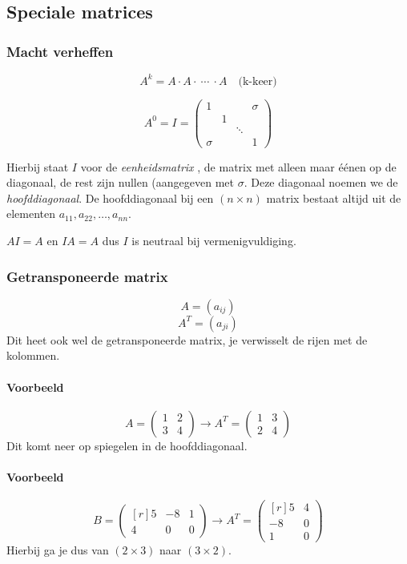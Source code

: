 \subsection{Speciale matrices}
\subsubsection{Macht verheffen}
\[ A^k = A \cdot A \cdot ~ \cdots ~ \cdot A \quad \mbox{(k-keer)} \]

\[ A^0 = I = \begin{pmatrix}
	1 & & &\sigma \\
	& 1 & &\\
	& & \ddots & \\
	\sigma & & & 1
\end{pmatrix} \]
	
	Hierbij staat $I$ voor de \emph{eenheidsmatrix} , de matrix met alleen maar \'e\'enen op de diagonaal, de rest zijn nullen (aangegeven met $\sigma$. Deze diagonaal noemen we de \emph{hoofddiagonaal}.  De hoofddiagonaal bij een $(n \times n)$ matrix bestaat altijd uit de elementen $a_{11}, a_{22}, \ldots, a_{nn}$.
	
	$AI = A$ en $IA = A$ dus $I$ is neutraal bij vermenigvuldiging.

\subsubsection{Getransponeerde matrix}
\[ A = (a_{ij}) \]
\[ A^T = (a_{ji}) \]
Dit heet ook wel de getransponeerde matrix, je verwisselt de rijen met de kolommen.

\paragraph{Voorbeeld}
\[ A = \begin{pmatrix} 1 & 2 \\ 3 & 4 \end{pmatrix} \to A^T = \begin{pmatrix} 1 & 3 \\ 2 & 4 \end{pmatrix} \]
Dit komt neer op spiegelen in de hoofddiagonaal.

\paragraph{Voorbeeld}
\[ B = \begin{pmatrix*}[r] 5 & -8 & 1 \\ 4 & 0 & 0 \end{pmatrix*} \to A^T = \begin{pmatrix*}[r] 5 & 4 \\ -8 & 0 \\ 1 & 0 \end{pmatrix*} \]
Hierbij ga je dus van $(2 \times 3)$ naar $(3 \times 2)$.

